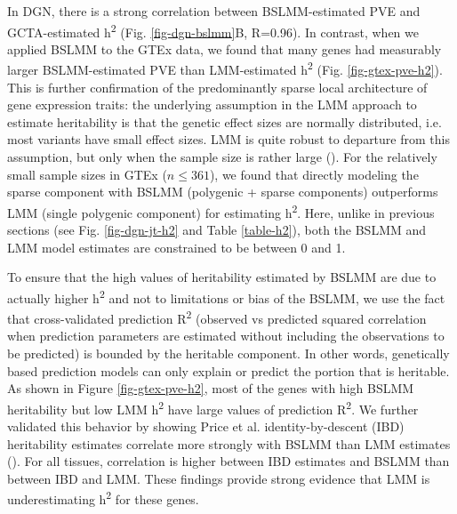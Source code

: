\documentclass[10pt,letterpaper]{article}
\begin{document}
In DGN, there is a strong correlation between BSLMM-estimated PVE and GCTA-estimated h\textsuperscript{2} (Fig. \ref{fig-dgn-bslmm}B, R=0.96). In contrast, when we applied BSLMM to the GTEx data, we found that many genes had measurably larger BSLMM-estimated PVE than LMM-estimated h\textsuperscript{2} (Fig. \ref{fig-gtex-pve-h2}). This is further confirmation of the predominantly sparse local architecture of gene expression traits: the underlying assumption in the LMM approach to estimate heritability is that the genetic effect sizes are normally distributed, i.e. most variants have small effect sizes. LMM is quite robust to departure from this assumption, but only when the sample size is rather large (). For the relatively small sample sizes in GTEx (\(n \leq 361\)), we found that directly modeling the sparse component with BSLMM (polygenic + sparse components) outperforms LMM (single polygenic component) for estimating h\textsuperscript{2}. Here, unlike in previous sections (see Fig. \ref{fig-dgn-jt-h2} and Table \ref{table-h2}), both the BSLMM and LMM model estimates are constrained to be between 0 and 1. 

To ensure that the high values of heritability estimated by BSLMM are due to actually higher h\textsuperscript{2} and not to limitations or bias of the BSLMM, we use the fact that cross-validated prediction R\textsuperscript{2} (observed vs predicted squared correlation when prediction parameters are estimated without including the observations to be predicted) is bounded by the heritable component. In other words, genetically based prediction models can only explain or predict the portion that is heritable. As shown in Figure \ref{fig-gtex-pve-h2}, most of the genes with high BSLMM heritability but low LMM h\textsuperscript{2} have large values of prediction R\textsuperscript{2}. 
We further validated this behavior by showing Price et al. \cite{Price_2011} identity-by-descent (IBD) heritability estimates correlate more strongly with BSLMM than LMM estimates (). For all tissues, correlation is higher between IBD estimates and BSLMM than between IBD and LMM. These findings provide strong evidence that LMM is underestimating h\textsuperscript{2} for these genes.

\end{document}
